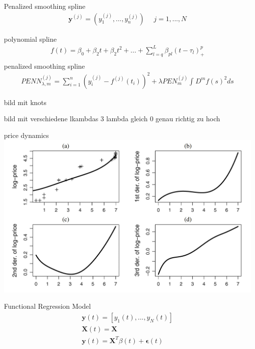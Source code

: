 \documentclass[hyperref={pdfpagelabels=false}]{beamer}
\begin{document}
\begin{frame}{Penalized smoothing spline}
\begin{align*}
\mathbf{y}^{(j)}=(y_1^{(j)},...,y_n^{(j)}) \ \ \ \ \ \     j=1,...,N 
\end{align*}

polynomial spline %
\begin{align*}
f(t)=\beta_0+\beta_2t+\beta_2t^2+...+\sum_{l=q}^L \beta_{pl}(t-\tau_l)^p_+ \\ 
\end{align*}
penalized smoothing spline
\begin{align*}
PENN^{(j)}_{\lambda,m}=\sum_{i=1}^n (y_i^{(j)}-f^{(j)}(t_i))^2+\lambda PEN^{(j)}_m \int_{}^{}D^mf(s)^2 ds %
\end{align*}
\end{frame}

\begin{frame}{bild mit knots}

\end{frame}

\begin{frame}{bild mit verschiedene lkambdas 3 lambda gleich 0 genau richtig zu hoch}

\end{frame}

\begin{frame}{price dynamics} %
\center
\includegraphics[width=1\textwidth]{smooth_velocity} %
\end{frame}


\begin{frame}{Functional Regression Model} %
\begin{align}
\mathbf{y}(t) = [y_1(t),...,y_N(t)] \nonumber \\ \mathbf{X}(t)=\mathbf{X} \nonumber \\ \mathbf{y}(t)=\mathbf{X}^T\beta(t)+\mathbf{\epsilon}(t) \nonumber 
\end{align}
\end{frame}
\end{document}
